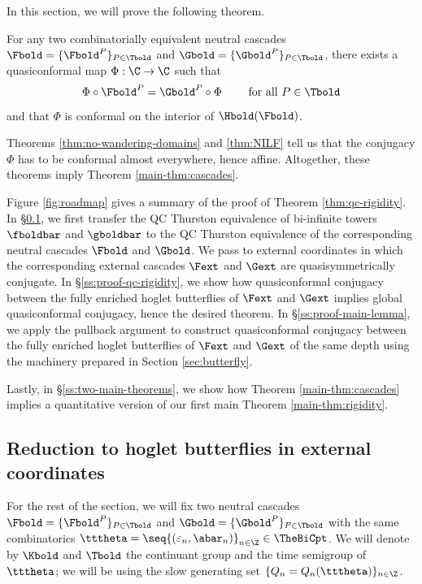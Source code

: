 \documentclass{amsart}
\begin{document}
In this section, we will prove the following theorem.

\begin{theorem}
\label{thm:qc-rigidity}
    For any two combinatorially equivalent neutral cascades $\Fbold = \{\Fbold^P\}_{P \in \Tbold}$ and $\Gbold = \{\Gbold^P\}_{P \in \Tbold}$, there exists a quasiconformal map $\Phi : \C \to \C$ such that 
    \[
    \Phi \circ \Fbold^P = \Gbold^P \circ \Phi \qquad \text{ for all } P \in \Tbold
    \]
    and that $\Phi$ is conformal on the interior of $\Hbold(\Fbold)$.
\end{theorem}

Theorems \ref{thm:no-wandering-domains} and \ref{thm:NILF} tell us that the conjugacy $\Phi$ has to be conformal almost everywhere, hence affine.
Altogether, these theorems imply Theorem \ref{main-thm:cascades}.

Figure \ref{fig:roadmap} gives a summary of the proof of Theorem \ref{thm:qc-rigidity}.
In \S\ref{ss:reduction-to-butterflies}, we first transfer the QC Thurston equivalence of bi-infinite towers $\fboldbar$ and $\gboldbar$ to the QC Thurston equivalence of the corresponding neutral cascades $\Fbold$ and $\Gbold$.
We pass to external coordinates in which the corresponding external cascades $\Fext$ and $\Gext$ are quasisymmetrically conjugate.
In \S\ref{ss:proof-qc-rigidity}, we show how quasiconformal conjugacy between the fully enriched hoglet butterflies of $\Fext$ and $\Gext$ implies global quasiconformal conjugacy, hence the desired theorem.
In \S\ref{ss:proof-main-lemma}, we apply the pullback argument to construct quasiconformal conjugacy between the fully enriched hoglet butterflies of $\Fext$ and $\Gext$ of the same depth using the machinery prepared in Section \ref{sec:butterfly}.

Lastly, in \S\ref{ss:two-main-theorems}, we show how Theorem \ref{main-thm:cascades} implies a quantitative version of our first main Theorem \ref{main-thm:rigidity}.

\subsection{Reduction to hoglet butterflies in external coordinates}
\label{ss:reduction-to-butterflies}

For the rest of the section, we will fix two neutral cascades $\Fbold = \{\Fbold^P\}_{P \in \Tbold}$ and $\Gbold = \{\Gbold^P\}_{P \in \Tbold}$ with the same combinatorics $\tttheta = \seq{(\varepsilon_n, \abar_n)}_{n\in\Z} \in \TheBiCpt$.
We will denote by $\Kbold$ and $\Tbold$ the continuant group and the time semigroup of $\tttheta$; we will be using the slow generating set $\{Q_n = Q_n(\tttheta)\}_{n\in\Z}$.
\end{document}
